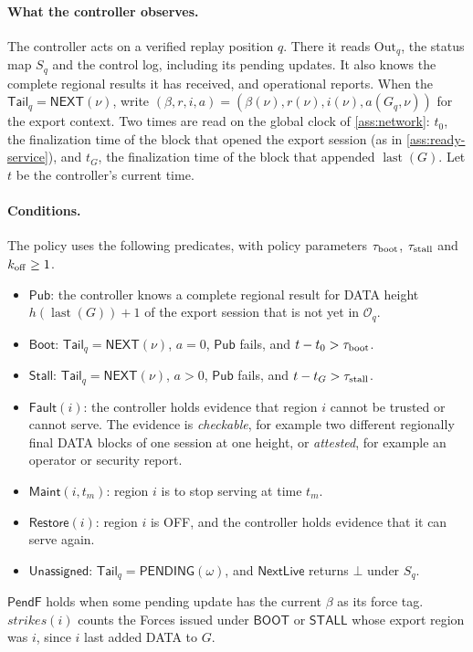 \documentclass[11pt,a4paper]{article}
\newcommand{\tagg}[1]{\ensuremath{\mathsf{#1}}}
\begin{document}
\paragraph{What the controller observes.}
The controller acts on a verified replay position $q$. There it reads
$\mathrm{Out}_q$, the status map $S_q$ and the
control log, including its pending updates. It also knows the complete
regional results it has received, and operational reports. When the
$\mathsf{Tail}_q=\tagg{NEXT}(\nu)$, write
$(\beta,r,i,a)=(\beta(\nu),r(\nu),i(\nu),a(G_q,\nu))$
for the export context. Two times are read on the global clock of
\cref{ass:network}: $t_0$, the finalization time of the block
that opened the export session (as in \cref{ass:ready-service}), and
$t_G$, the finalization time of the block that appended
$\operatorname{last}(G)$. Let $t$ be the controller's current time.

\paragraph{Conditions.}
The policy uses the following predicates, with policy parameters
$\tau_{\rm boot}$, $\tau_{\rm stall}$ and $k_{\rm off}\ge1$.
\begin{itemize}
\item $\tagg{Pub}$: the controller knows a complete regional result for
DATA height $h(\operatorname{last}(G))+1$ of the export session that is
not yet in $\mathcal O_q$.
\item $\tagg{Boot}$: $\mathsf{Tail}_q=\tagg{NEXT}(\nu)$, $a=0$, $\tagg{Pub}$ fails,
and $t-t_0>\tau_{\rm boot}$.
\item $\tagg{Stall}$: $\mathsf{Tail}_q=\tagg{NEXT}(\nu)$, $a>0$, $\tagg{Pub}$ fails,
and $t-t_G>\tau_{\rm stall}$.
\item $\tagg{Fault}(i)$: the controller holds evidence that region $i$
cannot be trusted or cannot serve. The evidence is \emph{checkable}, for
example two different regionally final DATA blocks of one session at one
height, or \emph{attested}, for example an operator or security report.
\item $\tagg{Maint}(i,t_m)$: region $i$ is to stop serving at time $t_m$.
\item $\tagg{Restore}(i)$: region $i$ is OFF, and the controller holds
evidence that it can serve again.
\item $\tagg{Unassigned}$: $\mathsf{Tail}_q=\tagg{PENDING}(\omega)$, and
$\tagg{NextLive}$ returns $\bot$ under $S_q$.
\end{itemize}
$\tagg{PendF}$ holds when some pending update has the current $\beta$ as
its force tag. $\mathit{strikes}(i)$ counts the
Forces issued under \tagg{BOOT} or \tagg{STALL} whose export region was
$i$, since $i$ last added DATA to $G$.
\end{document}
